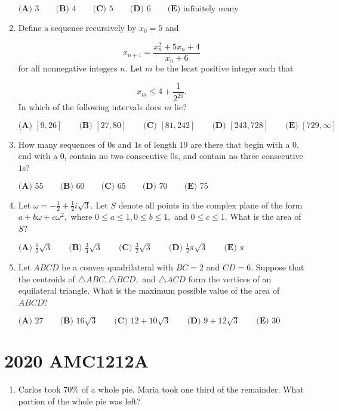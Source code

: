 \documentclass{article}
\begin{document}
\begin{enumerate}[label=\arabic*., itemsep=0.5em]
\(\textbf{(A) } 3 \qquad\textbf{(B) } 4 \qquad\textbf{(C) } 5 \qquad\textbf{(D) } 6 \qquad\textbf{(E) } \text{infinitely many}\)\par \vspace{0.5em}\item Define a sequence recursively by \(x_0=5\) and

\begin{equation*}
x_{n+1}=\frac{x_n^2+5x_n+4}{x_n+6}
\end{equation*}
for all nonnegative integers \(n.\) Let \(m\) be the least positive integer such that

\begin{equation*}
x_m\leq 4+\frac{1}{2^{20}}.
\end{equation*}
In which of the following intervals does \(m\) lie?

\(\textbf{(A) } [9,26] \qquad\textbf{(B) } [27,80] \qquad\textbf{(C) } [81,242]\qquad\textbf{(D) } [243,728] \qquad\textbf{(E) } [729,\infty]\)\par \vspace{0.5em}\item How many sequences of \(0\)s and \(1\)s of length \(19\) are there that begin with a \(0\), end with a \(0\), contain no two consecutive \(0\)s, and contain no three consecutive \(1\)s?

\(\textbf{(A) }55\qquad\textbf{(B) }60\qquad\textbf{(C) }65\qquad\textbf{(D) }70\qquad\textbf{(E) }75\)\par \vspace{0.5em}\item Let \(\omega=-\tfrac{1}{2}+\tfrac{1}{2}i\sqrt3.\) Let \(S\) denote all points in the complex plane of the form \(a+b\omega+c\omega^2,\) where \(0\leq a \leq 1,0\leq b\leq 1,\) and \(0\leq c\leq 1.\) What is the area of \(S\)?

\(\textbf{(A) } \frac{1}{2}\sqrt3 \qquad\textbf{(B) } \frac{3}{4}\sqrt3 \qquad\textbf{(C) } \frac{3}{2}\sqrt3\qquad\textbf{(D) } \frac{1}{2}\pi\sqrt3 \qquad\textbf{(E) } \pi\)\par \vspace{0.5em}\item Let \(ABCD\) be a convex quadrilateral with \(BC=2\) and \(CD=6.\) Suppose that the centroids of \(\triangle ABC,\triangle BCD,\) and \(\triangle ACD\) form the vertices of an equilateral triangle. What is the maximum possible value of the area of \(ABCD\)?

\(\textbf{(A) } 27 \qquad\textbf{(B) } 16\sqrt3 \qquad\textbf{(C) } 12+10\sqrt3 \qquad\textbf{(D) } 9+12\sqrt3 \qquad\textbf{(E) } 30\)\par \vspace{0.5em}\end{enumerate}\newpage\section*{2020 AMC1212A}\begin{enumerate}[label=\arabic*., itemsep=0.5em]\item Carlos took \(70\%\) of a whole pie. Maria took one third of the remainder. What portion of the whole pie was left?


\end{enumerate}
\end{document}
